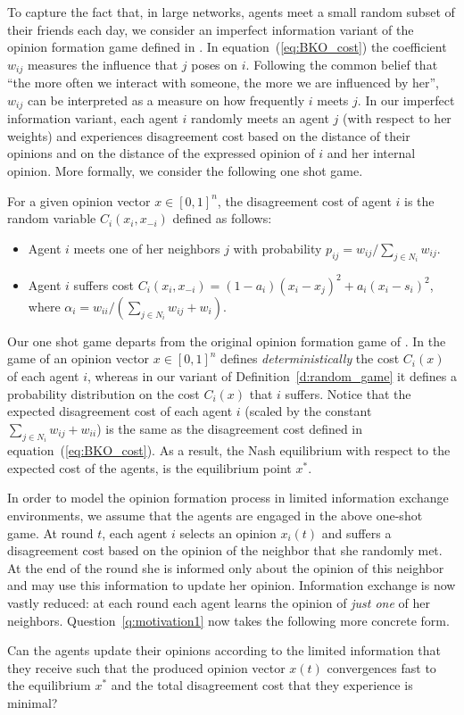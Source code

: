 To capture the fact that, in large networks, agents meet a small random subset
of their friends each day, we consider an imperfect information variant of the
opinion formation game defined in \cite{BKO11}. In equation~(\ref{eq:BKO_cost})
the coefficient $w_{ij}$ measures the influence that $j$ poses on $i$.
Following the common belief that \enquote{the more often we interact with
  someone, the more we are influenced by her}, $w_{ij}$ can be interpreted as a
measure on how frequently $i$ meets $j$. In our imperfect information variant,
each agent $i$ randomly meets an agent $j$ (with respect to her weights) and
experiences disagreement cost based on the distance of their opinions and on
the distance of the expressed opinion of $i$ and her internal opinion.  More
formally, we consider the following one shot game.
%
\begin{definition}\label{d:random_game}
  For a given opinion vector $x \in [0,1]^n$, the disagreement cost of agent
  $i$ is the random variable $C_i(x_i,x_{-i})$ defined as follows:
  \begin{itemize}
    \item Agent $i$ meets one of her neighbors $j$ with probability $p_{ij}=
      w_{ij}/\sum_{j\in N_i}w_{ij}$.
    \item Agent $i$ suffers cost $C_i(x_i , x_{-i}) = (1-a_i)(x_i-x_j)^2 +
      a_i(x_i-s_i)^2$, where $\alpha_i = w_{ii}/(\sum_{j\in N_i}w_{ij}+w_i)$.
  \end{itemize}
\end{definition}
%
Our one shot game departs from the original opinion formation game of
\cite{BKO11}.  In the game of \cite{BKO11} an opinion vector $x\in [0,1]^n$
defines \emph{deterministically} the cost $C_i(x)$ of each agent $i$, whereas
in our variant of Definition~\ref{d:random_game} it defines a probability
distribution on the cost $C_i(x)$ that $i$ suffers.  Notice that the expected
disagreement cost of each agent $i$ (scaled by the constant $\sum_{j\in
  N_i}w_{ij}+w_{ii}$) is the same as the disagreement cost defined in
equation~(\ref{eq:BKO_cost}).  As a result, the Nash equilibrium with respect
to the expected cost of the agents, is the equilibrium point $x^*$.

In order to model the opinion formation process in limited information exchange
environments, we assume that the agents are engaged in the above one-shot game.
At round $t$, each agent $i$ selects an opinion $x_i(t)$ and suffers a
disagreement cost based on the opinion of the neighbor that she randomly met.
At the end of the round she is informed only about the opinion of this neighbor
and may use this information to update her opinion. Information exchange is now
vastly reduced: at each round each agent learns the opinion of \emph{just one}
of her neighbors.  Question~\ref{q:motivation1} now takes the following more
concrete form.
%
\begin{question}\label{q:motivation2}
  Can the agents update their opinions according to the limited information
  that they receive such that the produced opinion vector $x(t)$ convergences
  fast to the equilibrium $x^*$ and the total disagreement cost that they
  experience is minimal?
\end{question}

